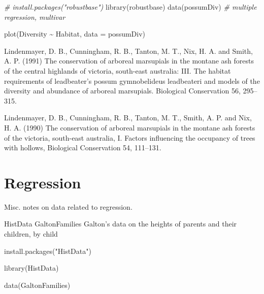 \documentclass[
]{book}
\newenvironment{Shaded}{\begin{snugshade}}{\end{snugshade}}
\newcommand{\AttributeTok}[1]{\textcolor[rgb]{0.77,0.63,0.00}{#1}}
\newcommand{\CommentTok}[1]{\textcolor[rgb]{0.56,0.35,0.01}{\textit{#1}}}
\newcommand{\FunctionTok}[1]{\textcolor[rgb]{0.00,0.00,0.00}{#1}}
\newcommand{\NormalTok}[1]{#1}
\newcommand{\SpecialCharTok}[1]{\textcolor[rgb]{0.00,0.00,0.00}{#1}}
\newcommand{\StringTok}[1]{\textcolor[rgb]{0.31,0.60,0.02}{#1}}
\begin{document}
\begin{Shaded}
\begin{Highlighting}[]
\CommentTok{\# install.packages("robustbase")}
\FunctionTok{library}\NormalTok{(robustbase)}
\FunctionTok{data}\NormalTok{(possumDiv) }\CommentTok{\# multiple regression, multivar}

\FunctionTok{plot}\NormalTok{(Diversity }\SpecialCharTok{\textasciitilde{}}\NormalTok{ Habitat, }\AttributeTok{data =}\NormalTok{ possumDiv)}
\end{Highlighting}
\end{Shaded}

Lindenmayer, D. B., Cunningham, R. B., Tanton, M. T., Nix, H. A. and Smith, A. P. (1991) The conservation of arboreal marsupials in the montane ash forests of the central highlands of victoria, south-east australia: III. The habitat requirements of leadbeater's possum gymnobelideus leadbeateri and models of the diversity and abundance of arboreal marsupials. Biological Conservation 56, 295--315.

Lindenmayer, D. B., Cunningham, R. B., Tanton, M. T., Smith, A. P. and Nix, H. A. (1990) The conservation of arboreal marsupials in the montane ash forests of the victoria, south-east australia, I. Factors influencing the occupancy of trees with hollows, Biological Conservation 54, 111--131.

\hypertarget{regression}{%
\chapter{Regression}\label{regression}}

Misc. notes on data related to regression.

HistData GaltonFamilies Galton's data on the heights of parents and their children, by child

\begin{Shaded}
\begin{Highlighting}[]
\FunctionTok{install.packages}\NormalTok{(}\StringTok{"HistData"}\NormalTok{)}
\end{Highlighting}
\end{Shaded}

\begin{Shaded}
\begin{Highlighting}[]
\FunctionTok{library}\NormalTok{(HistData)}
\end{Highlighting}
\end{Shaded}

\begin{Shaded}
\begin{Highlighting}[]
\FunctionTok{data}\NormalTok{(GaltonFamilies)}
\end{Highlighting}
\end{Shaded}
\end{document}
